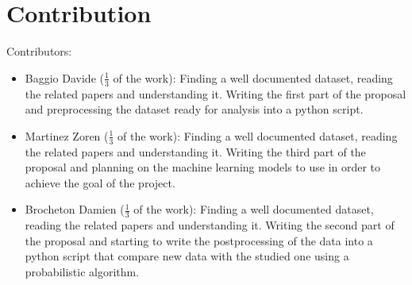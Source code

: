\documentclass[11pt,a4paper]{article}
\begin{document}
\section*{Contribution}
Contributors:
\begin{itemize}
	\setlength\itemsep{-0.3em}
	\item Baggio Davide ($\frac{1}{3}$ of the work): Finding a well documented dataset, reading the related papers and understanding it. Writing the first part of the proposal and preprocessing the dataset ready for analysis into a python script.
	\item Martinez Zoren ($\frac{1}{3}$ of the work): Finding a well documented dataset,  reading the related papers and understanding it. Writing the third part of the proposal and planning on the machine learning models to use in order to achieve the goal of the project.
	\item Brocheton Damien ($\frac{1}{3}$ of the work): Finding a well documented dataset,  reading the related papers and understanding it. Writing the second part of the proposal and starting to write the postprocessing of the data into a python script that compare new data with the studied one using a probabilistic algorithm.
\end{itemize}
\end{document}
